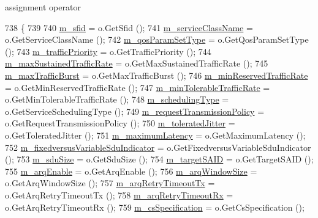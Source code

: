 assignment operator 


\begin{DoxyCode}
738 \{
739 
740   \hyperlink{classns3_1_1ServiceFlow_ae39adff3ec14a28fc308208e56de4f82}{m\_sfid} = o.GetSfid ();
741   \hyperlink{classns3_1_1ServiceFlow_a1edc6872551d75cf65513464475539b1}{m\_serviceClassName} = o.GetServiceClassName ();
742   \hyperlink{classns3_1_1ServiceFlow_a76222bd599cc4e27578bafba5304d158}{m\_qosParamSetType} = o.GetQosParamSetType ();
743   \hyperlink{classns3_1_1ServiceFlow_a536ed647361dd0cc432aec5b4a6d661a}{m\_trafficPriority} = o.GetTrafficPriority ();
744   \hyperlink{classns3_1_1ServiceFlow_a604d5dcda6dbb58528799cf439584ecb}{m\_maxSustainedTrafficRate} = o.GetMaxSustainedTrafficRate ();
745   \hyperlink{classns3_1_1ServiceFlow_a6d99ed08420605f4f56188eced87ccd0}{m\_maxTrafficBurst} = o.GetMaxTrafficBurst ();
746   \hyperlink{classns3_1_1ServiceFlow_a54dc771349ed7d93631e4a44299838d7}{m\_minReservedTrafficRate} = o.GetMinReservedTrafficRate ();
747   \hyperlink{classns3_1_1ServiceFlow_a3b8d632776a81daa9306c1e976685aee}{m\_minTolerableTrafficRate} = o.GetMinTolerableTrafficRate ();
748   \hyperlink{classns3_1_1ServiceFlow_a2d3227119fefd7969d145645cdb693af}{m\_schedulingType} = o.GetServiceSchedulingType ();
749   \hyperlink{classns3_1_1ServiceFlow_a019520fe5d683d8c79465830166815ce}{m\_requestTransmissionPolicy} = o.GetRequestTransmissionPolicy ();
750   \hyperlink{classns3_1_1ServiceFlow_a225bda97e6281ab2c5a5d1b9682bf21b}{m\_toleratedJitter} = o.GetToleratedJitter ();
751   \hyperlink{classns3_1_1ServiceFlow_a3b511a39a2dc94f5649b127c9e7a2073}{m\_maximumLatency} = o.GetMaximumLatency ();
752   \hyperlink{classns3_1_1ServiceFlow_abcc372b51b2b646d66af51fb2231a183}{m\_fixedversusVariableSduIndicator} = o.GetFixedversusVariableSduIndicator
       ();
753   \hyperlink{classns3_1_1ServiceFlow_ac6e5539e9c678970045eb8fe247903e6}{m\_sduSize} = o.GetSduSize ();
754   \hyperlink{classns3_1_1ServiceFlow_a0155ea4031007c532c4a206561ec8835}{m\_targetSAID} = o.GetTargetSAID ();
755   \hyperlink{classns3_1_1ServiceFlow_abbea8cd5abb577970a936459f71f4c07}{m\_arqEnable} = o.GetArqEnable ();
756   \hyperlink{classns3_1_1ServiceFlow_ab160ff007191a43ea79a77d7da31d1cf}{m\_arqWindowSize} = o.GetArqWindowSize ();
757   \hyperlink{classns3_1_1ServiceFlow_a4ec13b36ebe74498e5556ad162f001f0}{m\_arqRetryTimeoutTx} = o.GetArqRetryTimeoutTx ();
758   \hyperlink{classns3_1_1ServiceFlow_acdaa53c3298bc50b58a06b30dabb33d2}{m\_arqRetryTimeoutRx} = o.GetArqRetryTimeoutRx ();
759   \hyperlink{classns3_1_1ServiceFlow_a17884a9cb0e15543e8d96f8241b680ae}{m\_csSpecification} = o.GetCsSpecification ();

\end{DoxyCode}
